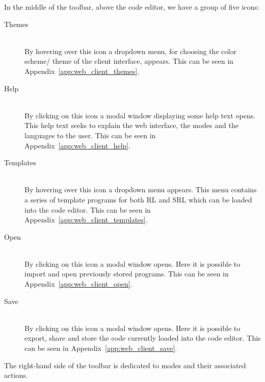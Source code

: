 In the middle of the toolbar, above the code editor, we have a group of five icons:
\begin{description}

  \item[ Themes]~\\
    By hovering over this icon a dropdown menu, for choosing the color scheme/ theme of the client interface, appears. This can be seen in Appendix~\ref{app:web_client_themes}.

  \item[ Help]~\\
    By clicking on this icon a modal window displaying some help text opens. This help text seeks to explain the web interface, the modes and the languages to the user.
    This can be seen in Appendix~\ref{app:web_client_help}.

  \item[ Templates]~\\
    By hovering over this icon a dropdown menu appears. This menu contains a series of template programs for both RL and SRL which can be loaded into the code editor.
    This can be seen in Appendix~\ref{app:web_client_templates}.

  \item[ Open]~\\
    By clicking on this icon a modal window opens. Here it is possible to import and open previously stored programs.
    This can be seen in Appendix~\ref{app:web_client_open}.

  \item[ Save]~\\
    By clicking on this icon a modal window opens. Here it is possible to export, share and store the code currently loaded into the code editor.
    This can be seen in Appendix~\ref{app:web_client_save}.

\end{description}
The right-hand side of the toolbar is dedicated to modes and their associated actions.

